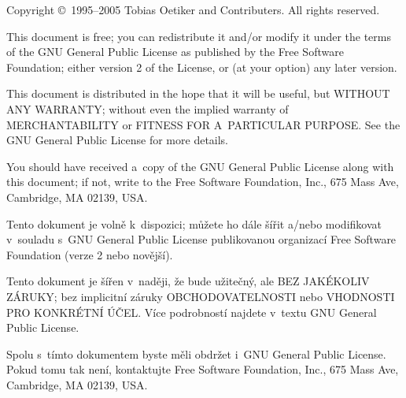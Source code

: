 \pagebreak
{}
\begin{small} 
  Copyright \copyright\ 1995--2005 Tobias Oetiker and Contributers.  All rights reserved.
 
  This document is free; you can redistribute it and/or modify it
  under the terms of the GNU General Public License as published by
  the Free Software Foundation; either version 2 of the License, or
  (at your option) any later version.
  
  This document is distributed in the hope that it will be useful, but
  WITHOUT ANY WARRANTY; without even the implied warranty of
  MERCHANTABILITY or FITNESS FOR A~PARTICULAR PURPOSE\@.  See the GNU
  General Public License for more details.
  
  You should have received a~copy of the GNU General Public License
  along with this document; if not, write to the Free Software
  Foundation, Inc., 675 Mass Ave, Cambridge, MA 02139, USA.
\end{small}
\vspace{1cm}

\begin{small}
Tento dokument je volně k~dispozici; můžete ho dále šířit a/nebo
modifikovat v~souladu s~GNU General Public License publikovanou
organizací Free Software Foundation (verze 2 nebo novější).
 
Tento dokument je šířen v~naději, že bude užitečný, ale BEZ
JAKÉKOLIV ZÁRUKY; bez implicitní záruky OBCHODOVATELNOSTI
nebo VHODNOSTI PRO KONKRÉTNÍ ÚČEL\@. Více podrobností najdete
v~textu GNU General Public License.
 
Spolu s~tímto dokumentem byste měli obdržet i~GNU General Public License.
Pokud tomu tak není, kontaktujte Free Software Foundation, Inc.,
675 Mass Ave, Cambridge, MA 02139, USA.
\end{small}

\endinput

%


